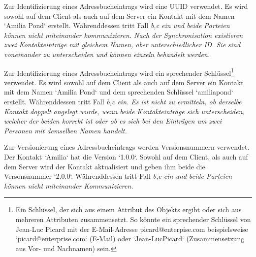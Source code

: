 %
%
\def \naturalkey {Ein Schlüssel, der sich aus einem Attribut des Objekts ergibt oder sich aus mehreren Attributen zusammensetzt. So könnte ein sprechender Schlüssel von Jean-Luc Picard mit der E-Mail-Adresse picard@enterpise.com beispielsweise `picard@enterprise.com` (E-Mail) oder `Jean-LucPicard` (Zusammensetzung aus Vor- und Nachnamen) sein.}
\def \logicalclock {Eine Logische Uhr ist eine Komponente die dazu dient, dem Datenobjekt einen eindeutigen Zeitstempel zuzuweisen. Die bekanntesten Verfahren für Logische Uhren in verteilten Systemen sind die Lamport-Uhr und die Vektoruhr. Beide verwenden Zähler die sich bei jedem Ereignis erhöhen. Einfach gesagt besteht die Lamport-Uhr aus einem Zeitstempel und einem Zähler, die Vektoruhr aus einem Zeitstempel und einem Vektor -- einer Liste aus Zählern.}
%
%
\begin{description}[leftmargin=0.5cm,style=nextline]
  \item[Szenario ID0 -- UUID:]
    Zur Identifizierung eines Adressbucheintrags wird eine \gls{UUID} verwendet. Es wird sowohl auf dem Client als auch auf dem Server ein Kontakt mit dem Namen `Amilia Pond` erstellt.
    Währenddessen tritt Fall \it{b,c} ein und beide Parteien können nicht miteinander kommunizieren. Nach der Synchronisation existieren zwei Kontakteinträge mit gleichem Namen, aber unterschiedlicher ID.
    Sie sind voneinander zu unterscheiden und können einzeln behandelt werden.\\
  \item[Szenario ID1 -- sprechender Schlüssel:]
    Zur Identifizierung eines Adressbucheintrags wird ein sprechender Schlüssel\footnote{\naturalkey} verwendet.
    Es wird sowohl auf dem Client als auch auf dem Server ein Kontakt mit dem Namen `Amilia Pond` und dem sprechenden Schlüssel `amiliapond` erstellt. Währenddessen tritt Fall \it{b,c} ein.
    Es ist nicht zu ermitteln, ob derselbe Kontakt doppelt angelegt wurde, wenn beide Kontakteinträge sich unterscheiden, welcher der beiden korrekt ist oder ob es sich bei den Einträgen um zwei Personen mit demselben Namen handelt.\\
  \item[Szenario V0 -- Versionsnummer:]
    Zur Versionierung eines Adressbucheintrags werden Versionsnummern verwendet. Der Kontakt `Amilia` hat die Version `1.0.0`.
    Sowohl auf dem Client, als auch auf dem Server wird der Kontakt aktualisiert und geben ihm beide die Versonsnummer `2.0.0`. Währenddessen tritt Fall \it{b,c} ein und beide Parteien können nicht miteinander Kommunizieren.

\end{description}
